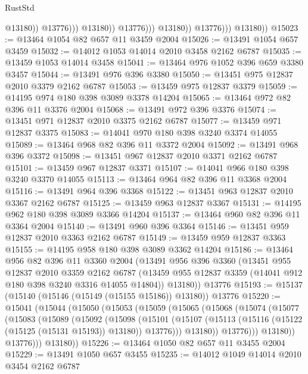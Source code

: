 \begin{lexlean}{RustStd}
\begin{coremodule}
{\begin{coremodule}
{{{{{{{{{{{{{{{{{{{{{{{{{{{{{{{                                      @13180))
                                  @13776)))
                            @13180))
                        @13776)))
                  @13180))
              @13776)))
        @13180))
@15023 := @13464 @1054 @82 @657 @11 @3459 @2004
@15026 := @13491 @1054 @657 @3459
@15032 := @14012 @1053 @14014 @2010 @3458 @2162 @6787
@15035 := @13459 @1053 @14014 @3458
@15041 := @13464 @976 @1052 @396 @659 @3380 @3457
@15044 := @13491 @976 @396 @3380
@15050 := @13451 @975 @12837 @2010 @3379 @2162 @6787
@15053 := @13459 @975 @12837 @3379
@15059 := @14195 @974 @180 @398 @3089 @3378 @14204
@15065 := @13464 @972 @82 @396 @11 @3376 @2004
@15068 := @13491 @972 @396 @3376
@15074 := @13451 @971 @12837 @2010 @3375 @2162 @6787
@15077 := @13459 @971 @12837 @3375
@15083 := @14041 @970 @180 @398 @3240 @3374 @14055
@15089 := @13464 @968 @82 @396 @11 @3372 @2004
@15092 := @13491 @968 @396 @3372
@15098 := @13451 @967 @12837 @2010 @3371 @2162 @6787
@15101 := @13459 @967 @12837 @3371
@15107 := @14041 @966 @180 @398 @3240 @3370 @14055
@15113 := @13464 @964 @82 @396 @11 @3368 @2004
@15116 := @13491 @964 @396 @3368
@15122 := @13451 @963 @12837 @2010 @3367 @2162 @6787
@15125 := @13459 @963 @12837 @3367
@15131 := @14195 @962 @180 @398 @3089 @3366 @14204
@15137 := @13464 @960 @82 @396 @11 @3364 @2004
@15140 := @13491 @960 @396 @3364
@15146 := @13451 @959 @12837 @2010 @3363 @2162 @6787
@15149 := @13459 @959 @12837 @3363
@15155 := @14195 @958 @180 @398 @3089 @3362 @14204
@15186 := @13464
    @956
    @82
    @396
    @11
    @3360
    @2004
    (@13491
      @956
      @396
      @3360
      (@13451
        @955
        @12837
        @2010
        @3359
        @2162
        @6787
        (@13459 @955 @12837 @3359 (@14041 @912 @180 @398 @3240 @3316 @14055 @14804))
        @13180))
    @13776
@15193 := @15137 (@15140 (@15146 (@15149 (@15155 @15186)) @13180)) @13776
@15220 := @15041
    (@15044
      (@15050
        (@15053
          (@15059
            (@15065
              (@15068
                (@15074
                  (@15077
                    (@15083
                      (@15089
                        (@15092
                          (@15098
                            (@15101
                              (@15107
                                (@15113 (@15116 (@15122 (@15125 (@15131 @15193)) @13180)) @13776)))
                            @13180))
                        @13776)))
                  @13180))
              @13776)))
        @13180))
@15226 := @13464 @1050 @82 @657 @11 @3455 @2004
@15229 := @13491 @1050 @657 @3455
@15235 := @14012 @1049 @14014 @2010 @3454 @2162 @6787
}}}}}}}}}}}}}}}}}}}}}}}}}}}}}}}
\end{coremodule}}
\end{coremodule}
\end{lexlean}
